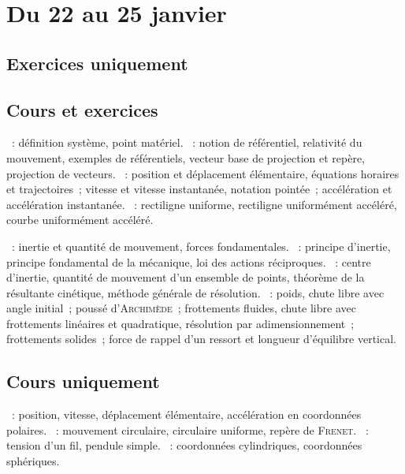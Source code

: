 \documentclass[a4paper, 10pt, final, garamond]{book}
\begin{document}
\setcounter{chapter}{14}

\chapter{Du 22 au 25 janvier}

\section{Exercices uniquement}

\section{Cours et exercices}
\begin{enumerate}[label=\Roman*]
	~: définition système, point
	matériel.
	~: notion de
	référentiel, relativité du mouvement, exemples de référentiels, vecteur
	base de projection et repère, projection de vecteurs.
	~: position et déplacement
	élémentaire, équations horaires et trajectoires~; vitesse et vitesse
	instantanée, notation pointée~; accélération et accélération
	instantanée.
	~: rectiligne uniforme, rectiligne
	uniformément accéléré, courbe uniformément accéléré.
\end{enumerate}

\begin{enumerate}[label=\Roman*]
	~: inertie et quantité de mouvement, forces
	fondamentales.
	~: principe d'inertie, principe
	fondamental de la mécanique, loi des actions réciproques.
	~: centre d'inertie, quantité de mouvement
	d'un ensemble de points, théorème de la résultante cinétique, méthode
	générale de résolution.
	~: poids, chute libre avec angle initial~; poussé
	d'\textsc{Archimède}~; frottements fluides, chute libre avec frottements
	linéaires et quadratique, résolution par adimensionnement~; frottements
	solides~; force de rappel d'un ressort et longueur d'équilibre vertical.
\end{enumerate}

\section{Cours uniquement}
\begin{enumerate}[label=\Roman*]
	~: position, vitesse,
	déplacement élémentaire, accélération en coordonnées polaires.
	~: mouvement circulaire,
	circulaire uniforme, repère de \textsc{Frenet}.
	~: tension d'un fil, pendule simple.
	~: coordonnées cylindriques,
	coordonnées sphériques.
\end{enumerate}
\end{document}
